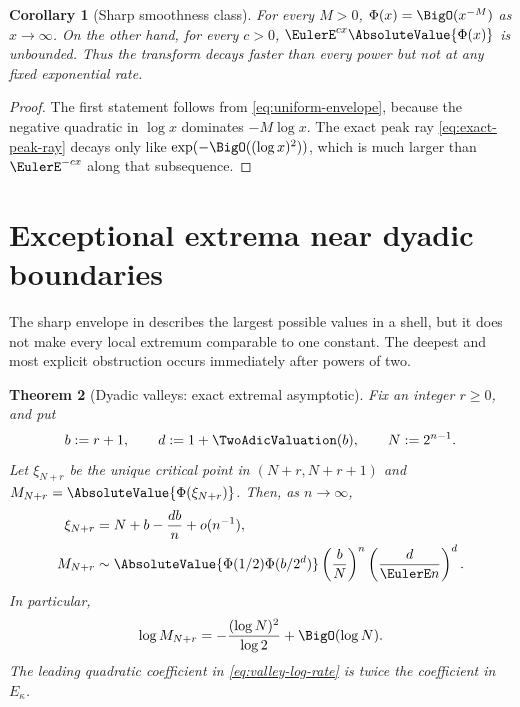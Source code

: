 \documentclass[11pt,oneside]{article}
\newtheorem{theorem}{Theorem}[section]
\newtheorem{corollary}[theorem]{Corollary}
\theoremstyle{definition}
\theoremstyle{remark}
\newcommand{\Phiup}{\Phi}
\begin{document}
\begin{corollary}[Sharp smoothness class]
\label{cor:superpoly-subexp}
For every $M>0$, $\Phiup(x)=\BigO(x^{-M})$ as $x\to\infty$.  On the other hand, for every
$c>0$, $\EulerE^{cx}\AbsoluteValue{\Phiup(x)}$ is unbounded.  Thus the transform decays faster than every
power but not at any fixed exponential rate.
\end{corollary}

\begin{proof}
The first statement follows from \eqref{eq:uniform-envelope}, because the negative
quadratic in $\log x$ dominates $-M\log x$.  The exact peak ray
\eqref{eq:exact-peak-ray} decays only like $\exp(-\BigO((\log x)^2))$, which is much larger
than $\EulerE^{-cx}$ along that subsequence.
\end{proof}

\section{Exceptional extrema near dyadic boundaries}
\label{sec:exceptional-extrema}

The sharp envelope in  describes the largest possible values in
a shell, but it does not make every local extremum comparable to one constant.  The deepest
and most explicit obstruction occurs immediately after powers of two.

\begin{theorem}[Dyadic valleys: exact extremal asymptotic]
\label{thm:dyadic-valleys}
Fix an integer $r\ge0$, and put
\[
 b:=r+1,
 \qquad
 d:=1+\TwoAdicValuation(b),
 \qquad
 N:=2^{n-1}.
\]
Let $\xi_{N+r}$ be the unique critical point in $(N+r,N+r+1)$ and
$M_{N+r}=\AbsoluteValue{\Phiup(\xi_{N+r})}$.  Then, as $n\to\infty$,
\begin{align}
 \xi_{N+r}
 &=N+b-\frac{db}{n}+o(n^{-1}),
 \label{eq:valley-location}\\
 M_{N+r}
 &\sim
 \AbsoluteValue{\Phiup(1/2)\Phiup(b/2^d)}
 \left(\frac bN\right)^n
 \left(\frac d{\EulerE n}\right)^d.
 \label{eq:valley-amplitude}
\end{align}
In particular,
\begin{equation}
 \log M_{N+r}
 =-\frac{(\log N)^2}{\log2}+\BigO(\log N).
 \label{eq:valley-log-rate}
\end{equation}
The leading quadratic coefficient in \eqref{eq:valley-log-rate} is twice the coefficient in
$E_\kappa$.
\end{theorem}
\end{document}
